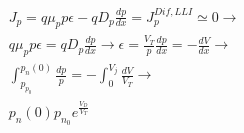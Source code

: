\documentclass{article}
\begin{document}
\begin{equation}
    \begin{aligned}
         & J_p=q\mu_pp\epsilon-qD_p\frac{dp}{dx}=J_p^{Dif,LLI}\simeq 0 \rightarrow                                       \\
         & q\mu_pp\epsilon=qD_p\frac{dp}{dx} \rightarrow \epsilon= \frac{V_T}{p}\frac{dp}{dx}=-\frac{dV}{dx} \rightarrow \\
         & \int_{p_{p_0}}^{p_n(0)}\frac{dp}{p}=-\int_{0}^{V_j}\frac{dV}{V_T} \rightarrow                                 \\
         & p_n(0)p_{n_0}e^{\frac{V_D}{V_T}}
    \end{aligned}
\end{equation}
\end{document}
